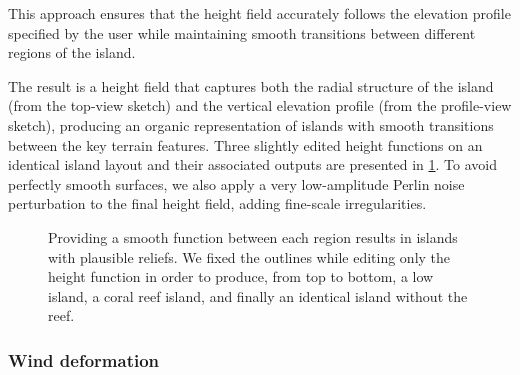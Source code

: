 This approach ensures that the height field accurately follows the elevation profile specified by the user while maintaining smooth transitions between different regions of the island.

The result is a height field that captures both the radial structure of the island (from the top-view sketch) and the vertical elevation profile (from the profile-view sketch), producing an organic representation of islands with smooth transitions between the key terrain features. Three slightly edited height functions on an identical island layout and their associated outputs are presented in \cref{fig:coral-island-procedural-smooth-heights}. To avoid perfectly smooth surfaces, we also apply a very low-amplitude Perlin noise perturbation to the final height field, adding fine-scale irregularities.

\begin{figure}
    \caption[Curve-based generation of an island, varying the shape of the profile function]{Providing a smooth function between each region results in islands with plausible reliefs. We fixed the outlines while editing only the height function in order to produce, from top to bottom, a low island, a coral reef island, and finally an identical island without the reef.}
    \label{fig:coral-island-procedural-smooth-heights}
\end{figure}

\subsubsection{Wind deformation}
\label{sec:coral-island-wind-deformation}


